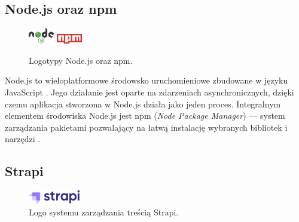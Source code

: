 \documentclass[a4paper, 12pt]{article}
\numberwithin{figure}{section}
\begin{document}
\begin{sloppypar}

\subsection*{Node.js oraz npm}

\begin{figure}[H] 
    \centering
        \includegraphics[width=0.1\textwidth]{images/node-logo.png}\hspace{16pt}
        \includegraphics[width=0.1\textwidth]{images/npm-logo.png}
    \caption{Logotypy Node.js oraz npm.}
\end{figure}

Node.js to wieloplatformowe środowsko uruchomieniowe zbudowane w języku JavaScript \cite{node}. Jego działanie jest oparte na zdarzeniach asynchronicznych, dzięki czemu aplikacja stworzona w Node.js działa jako jeden proces. Integralnym elementem środowiska Node.js jest npm (\textit{Node Package Manager}) --- system zarządzania pakietami pozwalający na łatwą instalację wybranych bibliotek i narzędzi \cite{npm}. 


\subsection*{Strapi}

\begin{figure}[H] 
    \centering
        \includegraphics[width=0.2\textwidth]{images/strapi-logo.png}
   \caption{Logo systemu zarządzania treścią Strapi.}
\end{figure}


\end{sloppypar}
\end{document}
